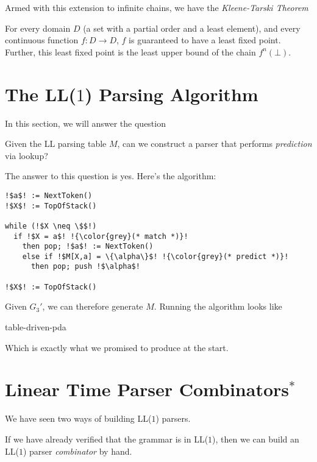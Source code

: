 Armed with this extension to infinite chains, we have the \textit{Kleene-Tarski Theorem}

\begin{theorem}
    For every domain $D$ (a set with a partial order and a least element), and every continuous function $f: D \rightarrow D$, $f$ is guaranteed to have a least fixed point. Further, this least fixed point is the least upper bound of the chain $f^n(\bot)$.
\end{theorem}


\section{The LL($1$) Parsing Algorithm}\label{section:running-the-table-driven-parser}
In this section, we will answer the question
\begin{center}
    Given the LL parsing table $M$, can we construct a parser that performs \textit{prediction} via lookup?
\end{center}

The answer to this question is yes. Here's the algorithm:

\begin{lstlisting}[style=pseudocode]
!$a$! := NextToken()
!$X$! := TopOfStack()

while (!$X \neq \$$!)
  if !$X = a$! !{\color{grey}(* match *)}!
    then pop; !$a$! := NextToken()
    else if !$M[X,a] = \{\alpha\}$! !{\color{grey}(* predict *)}!
      then pop; push !$\alpha$!
      
!$X$! := TopOfStack()
\end{lstlisting}

Given $G_3'$, we can therefore generate $M$. Running the algorithm looks like

\begin{center}
    {table-driven-pda}
\end{center}

Which is exactly what we promised to produce at the start.

\section{Linear Time Parser Combinators$^*$}
We have seen two ways of building LL($1$) parsers.

If we have already verified that the grammar is in LL($1$), then we can build an LL($1$) parser \textit{combinator} by hand. 

